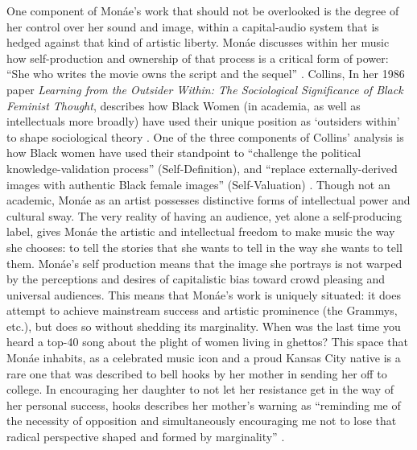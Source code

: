 \documentclass[a4paper, 11pt]{article} %
\begin{document}
One component of Mon\'ae's work that should not be overlooked is the degree of her control over her sound and image, within a capital-audio system that is hedged against that kind of artistic liberty.
Mon\'ae discusses within her music how self-production and ownership of that process is a critical form of power: 
``She who writes the movie owns the script and the sequel'' \cite{queen}.
Collins, In her 1986 paper \emph{Learning from the Outsider Within: The Sociological Significance of Black Feminist Thought}, describes how Black Women (in academia, as well as intellectuals more broadly) have used their unique position as `outsiders within' to shape sociological theory \cite{collins86}.
One of the three components of Collins' analysis is how Black women have used their standpoint to ``challenge the political knowledge-validation process'' (Self-Definition), and ``replace externally-derived images with authentic Black female images'' (Self-Valuation) \cite{collins86}.
Though not an academic, Mon\'ae as an artist possesses distinctive forms of intellectual power and cultural sway.
The very reality of having an audience, yet alone a self-producing label, gives Mon\'ae the artistic and intellectual freedom to make music the way she chooses: to tell the stories that she wants to tell in the way she wants to tell them.
Mon\'ae's self production means that the image she portrays is not warped by the perceptions and desires of capitalistic bias toward crowd pleasing and universal audiences.
This means that Mon\'ae's work is uniquely situated: it does attempt to achieve mainstream success and artistic prominence (the Grammys, etc.), but does so without shedding its marginality.
When was the last time you heard a top-40 song about the plight of women living in ghettos?
This space that Mon\'ae inhabits, as a celebrated music icon and a proud Kansas City native is a rare one that was described to bell hooks by her mother in sending her off to college.
In encouraging her daughter to not let her resistance get in the way of her personal success, hooks describes her mother's warning as ``reminding me of the necessity of opposition and simultaneously encouraging me not to lose that radical perspective shaped and formed by marginality'' \cite{hookschoosing}.
\end{document}
